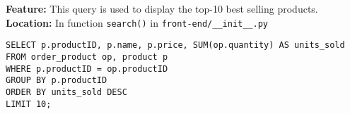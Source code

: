 \textbf{Feature:} This query is used to display the top-10 best selling products. \\
\textbf{Location:} In function \texttt{search()} in \texttt{front-end/\_\_init\_\_.py}

\begin{lstlisting}
SELECT p.productID, p.name, p.price, SUM(op.quantity) AS units_sold
FROM order_product op, product p
WHERE p.productID = op.productID
GROUP BY p.productID
ORDER BY units_sold DESC
LIMIT 10;
\end{lstlisting}